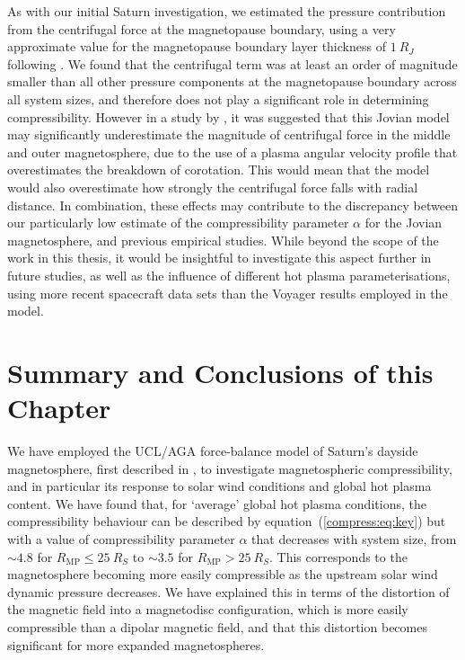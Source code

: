As with our initial Saturn investigation, we estimated the pressure contribution from the centrifugal force at the magnetopause boundary, using a very approximate value for the magnetopause boundary layer thickness of $\SI{1}{R_J}$ following \citet{delamere2010}. We found that the centrifugal term was at least an order of magnitude smaller than all other pressure components at the magnetopause boundary across all system sizes, and therefore does not play a significant role in determining compressibility. However in a study by \citet{nichols2011}, it was suggested that this Jovian model may significantly underestimate the magnitude of centrifugal force in the middle and outer magnetosphere, due to the use of a plasma angular velocity profile that overestimates the breakdown of corotation. This would mean that the model would also overestimate how strongly the centrifugal force falls with radial distance. In combination, these effects may contribute to the discrepancy between our particularly low estimate of the compressibility parameter $\alpha$ for the Jovian magnetosphere, and previous empirical studies. While beyond the scope of the work in this thesis, it would be insightful to investigate this aspect further in future studies, as well as the influence of different hot plasma parameterisations, using more recent spacecraft data sets than the Voyager results employed in the \citet{caudal1986} model.

\section{Summary and Conclusions of this Chapter}\label{compress:sec:conclusions}
We have employed the UCL/AGA force-balance model of Saturn's dayside magnetosphere, first described in \citet{achilleos2010a}, to investigate magnetospheric compressibility, and in particular its response to solar wind conditions and global hot plasma content. We have found that, for `average' global hot plasma conditions, the compressibility behaviour can be described by equation~(\ref{compress:eq:key}) but with a value of compressibility parameter $\alpha$ that decreases with system size, from ${\sim}4.8$ for $R_\mathrm{MP} \leq \SI{25}{R_S}$ to ${\sim}3.5$ for $R_\mathrm{MP} > \SI{25}{R_S}$. This corresponds to the magnetosphere becoming more easily compressible as the upstream solar wind dynamic pressure decreases. We have explained this in terms of the distortion of the magnetic field into a magnetodisc configuration, which is more easily compressible than a dipolar magnetic field, and that this distortion becomes significant for more expanded magnetospheres. 

